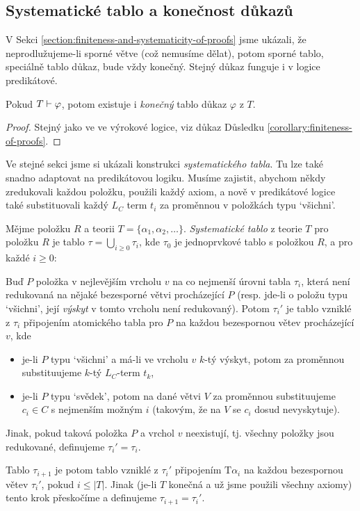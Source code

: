\subsection{Systematické tablo a konečnost důkazů}

V Sekci \ref{section:finiteness-and-systematicity-of-proofs} jsme ukázali, že neprodlužujeme-li sporné větve (což nemusíme dělat), potom sporné tablo, speciálně tablo důkaz, bude vždy konečný. Stejný důkaz funguje i v logice predikátové.

\begin{corollary}\label{corollary:finiteness-of-proofs-predicate}
    Pokud $T\vdash\varphi$, potom existuje i \emph{konečný} tablo důkaz $\varphi$ z $T$.
\end{corollary}
\begin{proof}
Stejný jako ve ve výrokové logice, viz důkaz Důsledku \ref{corollary:finiteness-of-proofs}.
\end{proof}

Ve stejné sekci jsme si ukázali konstrukci \emph{systematického tabla}. Tu lze také snadno adaptovat na predikátovou logiku. Musíme zajistit, abychom někdy zredukovali každou položku, použili každý axiom, a nově v predikátové logice také substituovali každý $L_C$ term $t_i$ za proměnnou v položkách typu `všichni'.

\begin{definition}
Mějme položku $R$ a teorii $T=\{\alpha_1,\alpha_2,\dots\}$. \emph{Systematické tablo} z teorie $T$ pro položku $R$ je tablo $\tau=\bigcup_{i\geq 0}\tau_i$, kde $\tau_0$ je jednoprvkové tablo s položkou $R$, a pro každé $i\geq 0$:

Buď $P$ položka v nejlevějším vrcholu $v$ na co nejmenší úrovni tabla $\tau_i$, která není redukovaná na nějaké bezesporné větvi procházející $P$ (resp. jde-li o položu typu `všichni', její \emph{výskyt} v tomto vrcholu není redukovaný). Potom $\tau_i'$ je tablo vzniklé z $\tau_i$ připojením atomického tabla pro $P$ na každou bezespornou větev procházející $v$, kde
\begin{itemize}
    \item je-li $P$ typu `všichni' a má-li ve vrcholu $v$ $k$-tý výskyt, potom za proměnnou substituujeme $k$-tý $L_C$-term $t_k$,
    \item je-li $P$ typu `svědek', potom na dané větvi $V$ za proměnnou substituujeme $c_i\in C$ s nejmenším možným $i$ (takovým, že na $V$ se $c_i$ dosud nevyskytuje).
\end{itemize}
Jinak, pokud taková položka $P$ a vrchol $v$ neexistují, tj. všechny položky jsou redukované, definujeme $\tau_i'=\tau_i$.

Tablo $\tau_{i+1}$ je potom tablo vzniklé z $\tau_i'$ připojením $\mathrm{T}\alpha_i$ na každou bezespornou větev $\tau_i'$, pokud $i\leq |T|$. Jinak (je-li $T$ konečná a už jsme použili všechny axiomy) tento krok přeskočíme a definujeme $\tau_{i+1}=\tau_i'$. 
\end{definition}

